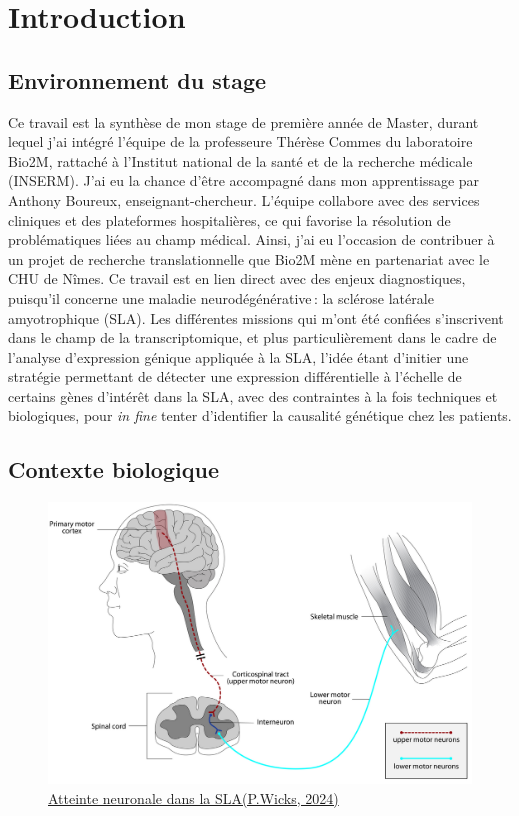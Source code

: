 \section{Introduction}
\subsection{Environnement du stage}

Ce travail est la synthèse de mon stage de première année de Master, durant lequel j’ai intégré l’équipe de la professeure Thérèse Commes du laboratoire Bio2M,  
rattaché à l’Institut national de la santé et de la recherche médicale (INSERM). J’ai eu la chance d’être accompagné dans mon apprentissage par Anthony Boureux, enseignant-chercheur.  
L’équipe collabore  avec des services cliniques et des plateformes hospitalières, ce qui favorise la résolution de problématiques liées au champ médical.  
Ainsi, j’ai eu l’occasion de contribuer à un projet de recherche translationnelle que Bio2M mène en partenariat avec le CHU de Nîmes. Ce travail est en lien direct avec des enjeux diagnostiques,
 puisqu’il concerne une maladie neurodégénérative : la sclérose latérale amyotrophique (SLA).  
Les différentes missions qui m’ont été confiées s’inscrivent dans le champ de la transcriptomique, et plus particulièrement dans le cadre de l’analyse d’expression génique appliquée à la SLA,  
l’idée étant d’initier une stratégie permettant de détecter une expression différentielle à l’échelle de certains gènes d’intérêt dans la SLA, avec des contraintes à la fois techniques et biologiques,  
pour \textit{in fine} tenter d’identifier la causalité génétique chez les patients.

\subsection{Contexte biologique}

\begin{figure} 
    \centering
    \includegraphics[width=1\linewidth]{Cortex_Spinal.jpg}
    \caption{\underline{Atteinte neuronale dans la SLA(P.Wicks, 2024)}}
    \label{fig:Cortex}
\end{figure}

